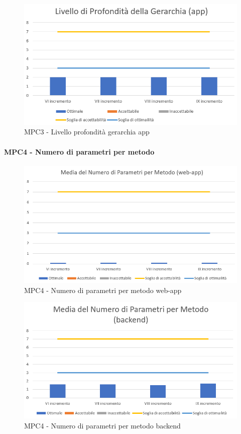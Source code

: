   \begin{figure}[h!]
    \centering
      \includegraphics[scale=1]{Immagini/LivProGer APPA.PNG}
    \caption{MPC3 - Livello profondità gerarchia app}
  \end{figure}

  
  \clearpage
  \paragraph{MPC4 - Numero di parametri per metodo}
  \begin{figure}[h!]
    \centering
      \includegraphics[scale=1]{Immagini/MediaNumPar WAA.PNG}
    \caption{MPC4 - Numero di parametri per metodo web-app}
  \end{figure}

  \begin{figure}[h!]
    \centering
      \includegraphics[scale=1]{Immagini/MediaNumPar BEA.PNG}
    \caption{MPC4 - Numero di parametri per metodo backend}
  \end{figure}

